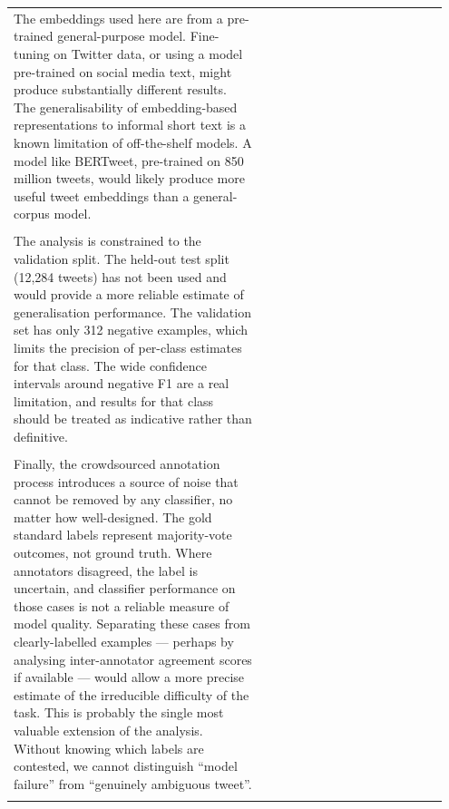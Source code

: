 \documentclass[11pt]{article}
\begin{document}
\begin{longtable}{|p{0.55\linewidth}|p{0.40\linewidth}|}
\hline
\rule{0pt}{3.5cm} & \\
\hline
The embeddings used here are from a pre-trained general-purpose model. Fine-tuning on Twitter data, or using a model pre-trained on social media text, might produce substantially different results. The generalisability of embedding-based representations to informal short text is a known limitation of off-the-shelf models. A model like BERTweet, pre-trained on 850 million tweets, would likely produce more useful tweet embeddings than a general-corpus model. & \\[2pt]
\hline
\rule{0pt}{3.5cm} & \\
\hline
The analysis is constrained to the validation split. The held-out test split (12,284 tweets) has not been used and would provide a more reliable estimate of generalisation performance. The validation set has only 312 negative examples, which limits the precision of per-class estimates for that class. The wide confidence intervals around negative F1 are a real limitation, and results for that class should be treated as indicative rather than definitive. & \\[2pt]
\hline
\rule{0pt}{3.5cm} & \\
\hline
Finally, the crowdsourced annotation process introduces a source of noise that cannot be removed by any classifier, no matter how well-designed. The gold standard labels represent majority-vote outcomes, not ground truth. Where annotators disagreed, the label is uncertain, and classifier performance on those cases is not a reliable measure of model quality. Separating these cases from clearly-labelled examples --- perhaps by analysing inter-annotator agreement scores if available --- would allow a more precise estimate of the irreducible difficulty of the task. This is probably the single most valuable extension of the analysis. Without knowing which labels are contested, we cannot distinguish ``model failure'' from ``genuinely ambiguous tweet''. & \\[2pt]
\hline
\rule{0pt}{3.5cm} & \\
\hline
\end{longtable}
\end{document}
